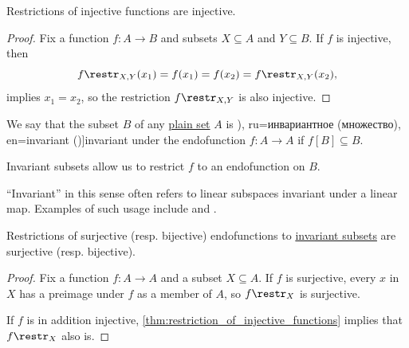 \begin{proposition}\label{thm:restriction_of_injective_functions}
  Restrictions of injective functions are injective.
\end{proposition}
\begin{proof}
  Fix a function \( f: A \to B \) and subsets \( X \subseteq A \) and \( Y \subseteq B \). If \( f \) is injective, then
  \begin{equation*}
    f\restr_{X,Y}(x_1) = f(x_1) = f(x_2) = f\restr_{X,Y}(x_2),
  \end{equation*}
  implies \( x_1 = x_2 \), so the restriction \( f\restr_{X,Y} \) is also injective.
\end{proof}

\begin{definition}\label{def:invariant_subset}
  We say that the subset \( B \) of any \hyperref[def:set]{plain set} \( A \) is \term[bg=инвариантно (подпространство) (\cite[def. X.1]{ГеновМиховскиМоллов1991Алгебра}), ru=инвариантное (множество), en=invariant (\cite[108]{DaveyPriestley2002LatticeTheory})]{invariant} under the endofunction \( f: A \to A \) if \( f[B] \subseteq B \).
\end{definition}
\begin{comments}
  \item Invariant subsets allow us to restrict \( f \) to an endofunction on \( B \).
  \item \enquote{Invariant} in this sense often refers to linear subspaces invariant under a linear map. Examples of such usage include \textcite[218]{Knapp2016BasicAlgebra} and \textcite[sec. 28.5]{Тыртышников2007ЛинейнаяАлгебра}.
\end{comments}

\begin{proposition}\label{thm:restriction_of_surjective_functions}
  Restrictions of surjective (resp. bijective) endofunctions to \hyperref[def:invariant_subset]{invariant subsets} are surjective (resp. bijective).
\end{proposition}
\begin{proof}
  Fix a function \( f: A \to A \) and a subset \( X \subseteq A \). If \( f \) is surjective, every \( x \) in \( X \) has a preimage under \( f \) as a member of \( A \), so \( f\restr_X \) is surjective.

  If \( f \) is in addition injective, \cref{thm:restriction_of_injective_functions} implies that \( f\restr_X \) also is.
\end{proof}

